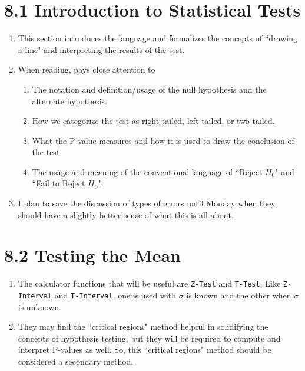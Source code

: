 \documentclass{article}
\begin{document}
\section*{8.1 Introduction to Statistical Tests}

\begin{enumerate}

  \item This section introduces the language and formalizes the concepts of ``drawing a line" and interpreting the results of the test.
  
  \item When reading, pays close attention to
  
    \begin{enumerate}
    
      \item The notation and definition/usage of the null hypothesis and the alternate hypothesis. 
      
      \item How we categorize the test as right-tailed, left-tailed, or two-tailed.
      
      \item What the P-value measures and how it is used to draw the conclusion of the test.
      
      \item The usage and meaning of the conventional language of ``Reject $H_0$" and ``Fail to Reject $H_0$".
      
    \end{enumerate}
    
  \item I plan to save the discussion of types of errors until Monday when they should have a slightly better sense of what this is all about.

\end{enumerate}

\newpage

\section*{8.2 Testing the Mean}

\begin{enumerate}

  \item The calculator functions that will be useful are \texttt{Z-Test} and \texttt{T-Test}. Like \texttt{Z-Interval} and \texttt{T-Interval}, one is used with $\sigma$ is known and the other when $\sigma$ is unknown.
  
  \item They may find the ``critical regions" method helpful in solidifying the concepts of hypothesis testing, but they will be required to compute and interpret P-values as well. So, this ``critical regions" method should be considered a secondary method.
  
\end{enumerate}
\end{document}
